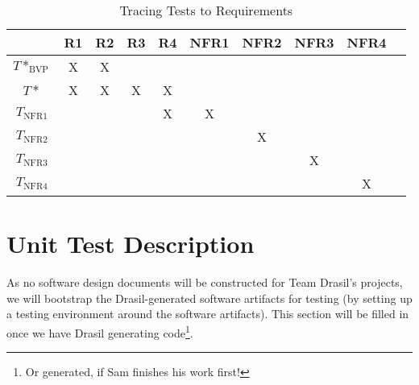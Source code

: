 \documentclass[12pt, titlepage]{article}
\begin{document}
\begin{longtable}{|c|c|c|c|c|c|c|c|c|c|}
    \caption{Tracing Tests to Requirements}
    \label{tab:trace_tests_to_reqs} \\
    
    \hline

                    & R1 & R2 & R3 & R4 & NFR1 & NFR2 & NFR3 & NFR4 \\ \hline
    $T*_\text{BVP}$ & X  & X  &    &    &      &      &      &      \\ \hline
    $T*$            & X  & X  & X  & X  &      &      &      &      \\ \hline
    $T_\text{NFR1}$ &    &    &    & X  & X    &      &      &      \\ \hline
    $T_\text{NFR2}$ &    &    &    &    &      & X    &      &      \\ \hline
    $T_\text{NFR3}$ &    &    &    &    &      &      & X    &      \\ \hline
    $T_\text{NFR4}$ &    &    &    &    &      &      &      & X    \\ \hline

\end{longtable}

\newpage{}

\section{Unit Test Description}
\label{sec:unit_test_description}

As no software design documents will be constructed for Team Drasil's projects,
we will bootstrap the Drasil-generated software artifacts for testing (by
setting up a testing environment around the software artifacts). This section
will be filled in once we have Drasil generating code\footnote{Or generated, if
Sam finishes his work first!}.


\newpage{}

\printbibliography{}

\end{document}
